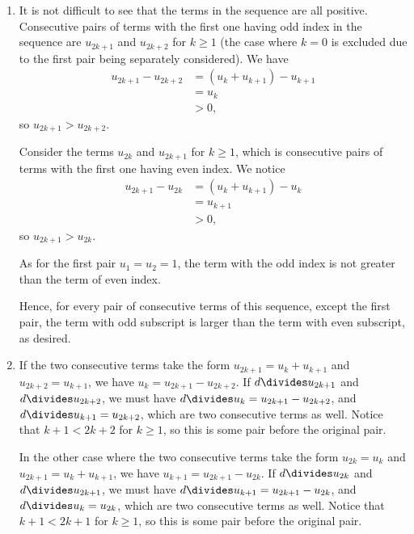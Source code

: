 \Question{\currfilebase}
\begin{enumerate}
    \item It is not difficult to see that the terms in the sequence are all positive. Consecutive pairs of terms with the first one having odd index in the sequence are \(u_{2k + 1}\) and \(u_{2k + 2}\) for \(k \geq 1\) (the case where \(k = 0\) is excluded due to the first pair being separately considered). We have
          \begin{align*}
              u_{2k + 1} - u_{2k + 2} & = (u_k + u_{k + 1}) - u_{k + 1} \\
                                      & = u_k                           \\
                                      & > 0,
          \end{align*}
          so \(u_{2k + 1} > u_{2k + 2}\).

          Consider the terms \(u_{2k}\) and \(u_{2k + 1}\) for \(k \geq 1\), which is consecutive pairs of terms with the first one having even index. We notice
          \begin{align*}
              u_{2k + 1} - u_{2k} & = (u_k + u_{k + 1}) - u_k \\
                                  & = u_{k + 1}               \\
                                  & > 0,
          \end{align*}
          so \(u_{2k + 1} > u_{2k}\).

          As for the first pair \(u_1 = u_2 = 1\), the term with the odd index is not greater than the term of even index.

          Hence, for every pair of consecutive terms of this sequence, except the first pair, the term with odd subscript is larger than the term with even subscript, as desired.

    \item If the two consecutive terms take the form \(u_{2k + 1} = u_k + u_{k + 1}\) and \(u_{2k + 2} = u_{k + 1}\), we have \(u_k = u_{2k + 1} - u_{2k + 2}\). If \(d \divides u_{2k + 1}\) and \(d \divides u_{2k + 2}\), we must have \(d \divides u_k = u_{2k + 1} - u_{2k + 2}\), and \(d \divides u_{k + 1} = u_{2k + 2}\), which are two consecutive terms as well. Notice that \(k + 1 < 2k + 2\) for \(k \geq 1\), so this is some pair before the original pair.

          In the other case where the two consecutive terms take the form \(u_{2k} = u_k\) and \(u_{2k + 1} = u_k + u_{k + 1}\), we have \(u_{k + 1} = u_{2k + 1} - u_{2k}\). If \(d \divides u_{2k}\) and \(d \divides u_{2k + 1}\), we must have \(d \divides u_{k + 1} = u_{2k + 1} - u_{2k}\), and \(d \divides u_k = u_{2k}\), which are two consecutive terms as well. Notice that \(k + 1 < 2k + 1\) for \(k \geq 1\), so this is some pair before the original pair.


\end{enumerate}

